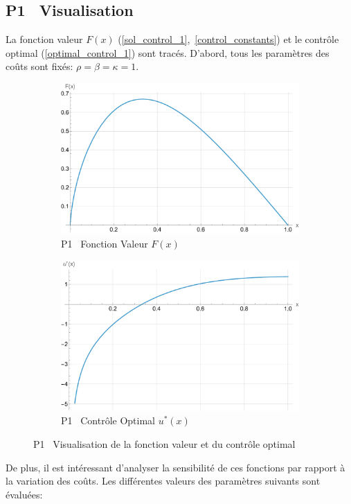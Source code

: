 \subsection{P1 \textemdash~Visualisation}
La fonction valeur $F(x)$ (\ref{sol_control_1},~\ref{control_constants}) et le contrôle optimal (\ref{optimal_control_1}) sont tracés. D'abord, tous les paramètres des coûts sont fixés: $\rho=\beta=\kappa=1$.
\begin{figure}[htb]
    \centering
    \begin{subfigure}{0.49\linewidth}
        \includegraphics[width=\linewidth]{img/validation/P1/p1_value.pdf}
        \caption{P1 \textemdash~Fonction Valeur $F(x)$}\label{fig:ValueVisualisation1}
    \end{subfigure}
    \hfill
    \begin{subfigure}{0.49\linewidth}
        \includegraphics[width=\linewidth]{img/validation/P1/p1_control.pdf}
        \caption{P1 \textemdash~Contrôle Optimal $u^*(x)$}\label{fig:ControlVisualisation1}
    \end{subfigure}
    \caption{P1 \textemdash~Visualisation de la fonction valeur et du contrôle optimal}\label{fig:ValueControlComparison1}
\end{figure}\FloatBarrier De plus, il est intéressant d'analyser la sensibilité de ces fonctions par rapport à la variation des coûts. Les différentes valeurs des paramètres suivants sont évaluées:
